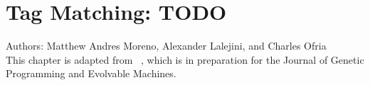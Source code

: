 \chapter{Tag Matching: TODO}
\label{ch:tag-matching}

\noindent
Authors: Matthew Andres Moreno, Alexander Lalejini, and Charles Ofria \\
This chapter is adapted from ~\citep{moreno2021matchmaker}, which is in preparation for the Journal of Genetic Programming and Evolvable Machines.
